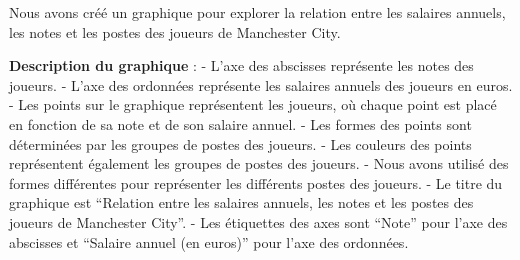 \documentclass[
]{article}
\begin{document}
Nous avons créé un graphique pour explorer la relation entre les
salaires annuels, les notes et les postes des joueurs de Manchester
City.

\textbf{Description du graphique} : - L'axe des abscisses représente les
notes des joueurs. - L'axe des ordonnées représente les salaires annuels
des joueurs en euros. - Les points sur le graphique représentent les
joueurs, où chaque point est placé en fonction de sa note et de son
salaire annuel. - Les formes des points sont déterminées par les groupes
de postes des joueurs. - Les couleurs des points représentent également
les groupes de postes des joueurs. - Nous avons utilisé des formes
différentes pour représenter les différents postes des joueurs. - Le
titre du graphique est ``Relation entre les salaires annuels, les notes
et les postes des joueurs de Manchester City''. - Les étiquettes des
axes sont ``Note'' pour l'axe des abscisses et ``Salaire annuel (en
euros)'' pour l'axe des ordonnées.
\end{document}
